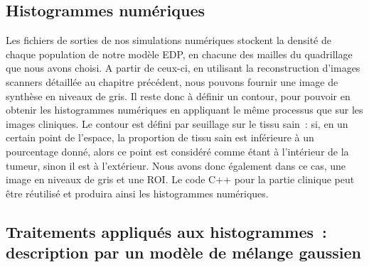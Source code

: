 \documentclass[main.tex]{subfiles}
\begin{document}
\subsection{Histogrammes numériques}
Les fichiers de sorties de nos simulations numériques stockent la densité de chaque population de notre modèle EDP, en chacune des mailles du quadrillage que nous avons choisi. 
A partir de ceux-ci, en utilisant la reconstruction d'images scanners détaillée au chapitre précédent, nous pouvons fournir une image de synthèse en niveaux de gris. 
Il reste donc à définir un contour, pour pouvoir en obtenir les histogrammes numériques en appliquant le même processus que sur les images cliniques. 
Le contour est défini par seuillage sur le tissu sain~: 
si, en un certain point de l'espace, la proportion de tissu sain est inférieure à un pourcentage donné, alors ce point est considéré comme étant à l'intérieur de la tumeur, sinon il est à l'extérieur. 
Nous avons donc également dans ce cas, une image en niveaux de gris et une ROI. Le code C++ pour la partie clinique peut être réutilisé et produira ainsi les histogrammes numériques.

\subsection{Traitements appliqués aux histogrammes~: description par un modèle de mélange  gaussien}
\end{document}
